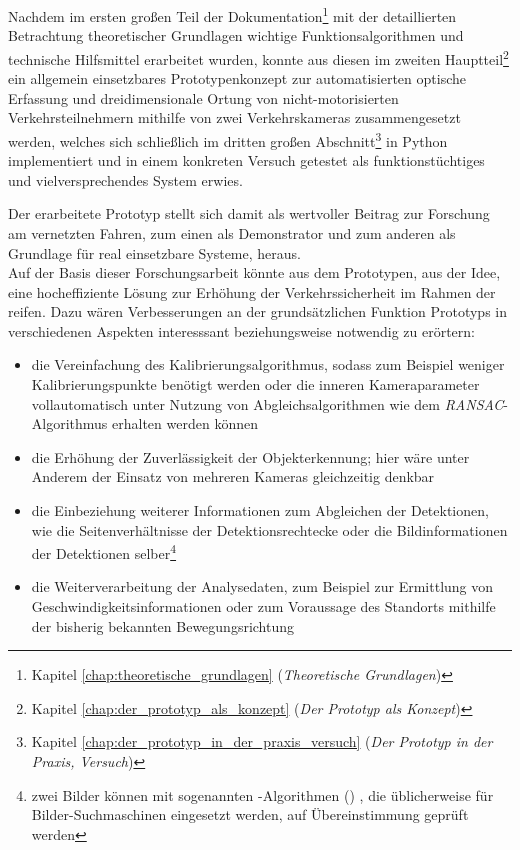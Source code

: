 

Nachdem im ersten großen Teil der Dokumentation\footnote{Kapitel \ref{chap:theoretische_grundlagen} (\emph{Theoretische Grundlagen})} mit der detaillierten Betrachtung theoretischer Grundlagen wichtige Funktionsalgorithmen und technische Hilfsmittel erarbeitet wurden, konnte aus diesen im zweiten Hauptteil\footnote{Kapitel \ref{chap:der_prototyp_als_konzept} (\emph{Der Prototyp als Konzept})} ein allgemein einsetzbares Prototypenkonzept zur automatisierten optische Erfassung und dreidimensionale Ortung von nicht-motorisierten Verkehrsteilnehmern mithilfe von zwei Verkehrskameras zusammengesetzt werden, welches sich schließlich im dritten großen Abschnitt\footnote{Kapitel \ref{chap:der_prototyp_in_der_praxis_versuch} (\emph{Der Prototyp in der Praxis, Versuch})} in Python implementiert und in einem konkreten Versuch getestet als funktionstüchtiges und vielversprechendes System erwies.\kleinerabstand

Der erarbeitete Prototyp stellt sich damit als wertvoller Beitrag zur Forschung am vernetzten Fahren, zum einen als Demonstrator und zum anderen als Grundlage für real einsetzbare Systeme, heraus.\\
Auf der Basis dieser Forschungsarbeit könnte aus dem Prototypen, aus der Idee, eine hocheffiziente Lösung zur Erhöhung der Verkehrssicherheit im Rahmen der  reifen. Dazu wären Verbesserungen an der grundsätzlichen Funktion Prototyps in verschiedenen Aspekten interesssant beziehungsweise notwendig zu erörtern:
\begin{itemize}
	\item die Vereinfachung des Kalibrierungsalgorithmus, sodass zum Beispiel weniger Kalibrierungspunkte benötigt werden oder die inneren Kameraparameter vollautomatisch unter Nutzung von Abgleichsalgorithmen wie dem \emph{RANSAC}-Algorithmus \cite{ransac} erhalten werden können
	\item die Erhöhung der Zuverlässigkeit der Objekterkennung; hier wäre unter Anderem der Einsatz von mehreren Kameras gleichzeitig denkbar
	\item die Einbeziehung weiterer Informationen zum Abgleichen der Detektionen, wie die Seitenverhältnisse der Detektionsrechtecke oder die Bildinformationen der Detektionen selber\footnote{zwei Bilder können mit sogenannten -Algorithmen () \cite{cbir}, die üblicherweise für Bilder-Suchmaschinen eingesetzt werden, auf Übereinstimmung geprüft werden}
	\item die Weiterverarbeitung der Analysedaten, zum Beispiel zur Ermittlung von Geschwindigkeitsinformationen oder zum Voraussage des Standorts mithilfe der bisherig bekannten Bewegungsrichtung
\end{itemize}
